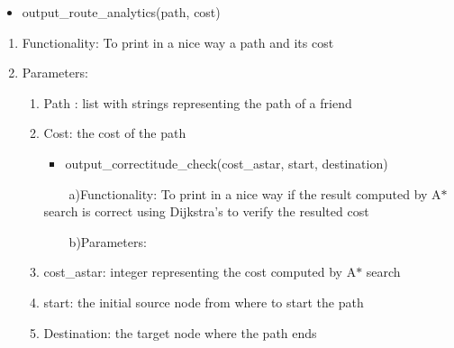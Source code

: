\documentclass[12pt]{article}
\begin{document}
\begin{justify}
 
\end{justify}\par

\begin{itemize}
	\item output\_route\_analytics(path, cost)
\end{itemize}\par

\begin{enumerate}
	\item Functionality: To print in a nice way a path and its cost\par

	\item Parameters:\par

\begin{enumerate}
	\item Path : list with strings representing the path of a friend\par

	\item Cost: the cost of the path\par


\vspace{\baselineskip}\begin{itemize}
	\item output\_correctitude\_check(cost\_astar, start, destination)
\end{itemize}\par

\begin{justify}
 \tabto{0.75in} \tab \ \ \ \  a)\tab Functionality: To print in a nice way if the result computed by A$\ast$  \tab \tab \tab \tab search is correct using Dijkstra’s to verify the resulted cost
\end{justify}\par

\begin{justify}
  \tabto{0.75in}  \tab \ \ \ \  b)\tab Parameters:
\end{justify}\par

	\item cost\_astar: integer representing the cost computed by A$\ast$  search\par

	\item start: the initial source node from where to start the path\par

	\item Destination: the target node where the path ends
\end{enumerate}
\end{enumerate}\par
\end{document}
